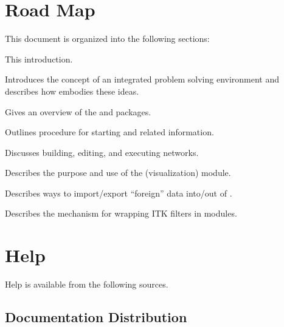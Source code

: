 

\section{Road Map}
\label{sec:roadmap}

This document is organized into the following sections:

\begin{description}
   This introduction.
  
   Introduces the concept of
  an integrated problem solving environment and describes how \SR{}
  embodies these ideas.
  
   Gives an overview
  of the \sr{} and \biopse{} packages.
  
   Outlines procedure
  for starting \sr{} and related information.

  Discusses building, editing, and executing
  networks.

  Describes the purpose and use of the \viewer{} (visualization) module.

  Describes ways to import/export ``foreign'' data into/out of \SR{}.

  Describes the mechanism for wrapping ITK filters in \sr{} modules.
\end{description}

\section{Help}
\label{sec:help}

Help is available from the following sources.

\subsection{Documentation Distribution}

